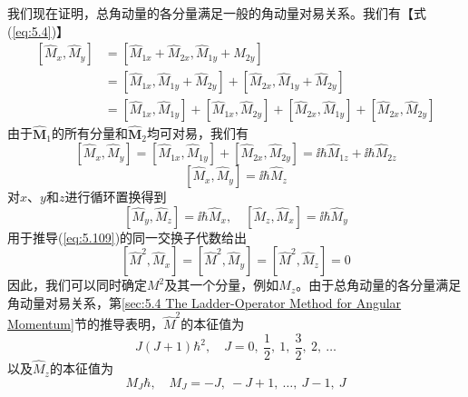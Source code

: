     我们现在证明，总角动量的各分量满足一般的角动量对易关系。我们有【式(\ref{eq:5.4})】
    \begin{equation*}
        \begin{aligned}
            \left[\hat{M}_x, \hat{M}_y\right] &= \left[\hat{M}_{1x} + \hat{M}_{2x}, \hat{M}_{1y} + \hat{M}_{2y}\right] \\
            &= \left[\hat{M}_{1x}, \hat{M}_{1y} + \hat{M}_{2y}\right] + \left[\hat{M}_{2x}, \hat{M}_{1y} + \hat{M}_{2y}\right] \\
            &= \left[\hat{M}_{1x}, \hat{M}_{1y}\right] + \left[\hat{M}_{1x}, \hat{M}_{2y}\right] + \left[\hat{M}_{2x}, \hat{M}_{1y}\right] + \left[\hat{M}_{2x}, \hat{M}_{2y}\right]
        \end{aligned}
    \end{equation*}
    由于$\hat{\mathbf{M}}_1$的所有分量和$\hat{\mathbf{M}}_2$均可对易，我们有
    \begin{equation*}
        \left[\hat{M}_x, \hat{M}_y\right] = \left[\hat{M}_{1x}, \hat{M}_{1y}\right] + \left[\hat{M}_{2x}, \hat{M}_{2y}\right] = \ii \hbar \hat{M}_{1z} + \ii \hbar \hat{M}_{2z}
    \end{equation*}
    \begin{equation}
        \left[\hat{M}_x, \hat{M}_y\right] = \ii \hbar \hat{M}_z
        \label{eq:11.27}
    \end{equation}
    对$x$、$y$和$z$进行循环置换得到
    \begin{equation}
        \left[\hat{M}_y, \hat{M}_z\right] = \ii \hbar \hat{M}_x, \quad \left[\hat{M}_z, \hat{M}_x\right] = \ii \hbar \hat{M}_y
        \label{eq:11.28}
    \end{equation}
    用于推导(\ref{eq:5.109})的同一交换子代数给出
    \begin{equation}
        \left[\hat{M}^2, \hat{M}_x\right] = \left[\hat{M}^2, \hat{M}_y\right] = \left[\hat{M}^2, \hat{M}_z\right] = 0
        \label{eq:11.29}
    \end{equation}
    因此，我们可以同时确定$M^2$及其一个分量，例如$M_z$。由于总角动量的各分量满足角动量对易关系，第\ref{sec:5.4 The Ladder-Operator Method for Angular Momentum}节的推导表明，$\hat{M}^2$的本征值为
    \begin{equation}
        \boxed{
            J\left(J + 1\right)\hbar^2, \quad J = 0, \: \frac{1}{2}, \: 1, \: \frac{3}{2}, \: 2, \: \ldots
        }
        \label{eq:11.30}
    \end{equation}
    以及$\hat{M}_z$的本征值为
    \begin{equation}
        \boxed{
            M_J\hbar, \quad M_J = -J, \: -J + 1, \: \ldots, \: J - 1, \: J
        }
        \label{eq:11.31}
    \end{equation}

